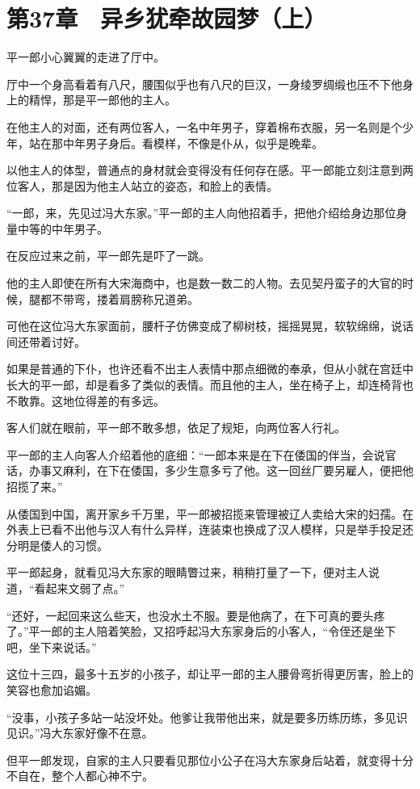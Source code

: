 \section{第37章　异乡犹牵故园梦（上）}

平一郎小心翼翼的走进了厅中。

厅中一个身高看着有八尺，腰围似乎也有八尺的巨汉，一身绫罗绸缎也压不下他身上的精悍，那是平一郎他的主人。

在他主人的对面，还有两位客人，一名中年男子，穿着棉布衣服，另一名则是个少年，站在那中年男子身后。看模样，不像是仆从，似乎是晚辈。

以他主人的体型，普通点的身材就会变得没有任何存在感。平一郎能立刻注意到两位客人，那是因为他主人站立的姿态，和脸上的表情。

“一郎，来，先见过冯大东家。”平一郎的主人向他招着手，把他介绍给身边那位身量中等的中年男子。

在反应过来之前，平一郎先是吓了一跳。

他的主人即使在所有大宋海商中，也是数一数二的人物。去见契丹蛮子的大官的时候，腿都不带弯，搂着肩膀称兄道弟。

可他在这位冯大东家面前，腰杆子仿佛变成了柳树枝，摇摇晃晃，软软绵绵，说话间还带着讨好。

如果是普通的下仆，也许还看不出主人表情中那点细微的奉承，但从小就在宫廷中长大的平一郎，却是看多了类似的表情。而且他的主人，坐在椅子上，却连椅背也不敢靠。这地位得差的有多远。

客人们就在眼前，平一郎不敢多想，依足了规矩，向两位客人行礼。

平一郎的主人向客人介绍着他的底细：“一郎本来是在下在倭国的伴当，会说官话，办事又麻利，在下在倭国，多少生意多亏了他。这一回丝厂要另雇人，便把他招揽了来。”

从倭国到中国，离开家乡千万里，平一郎被招揽来管理被辽人卖给大宋的妇孺。在外表上已看不出他与汉人有什么异样，连装束也换成了汉人模样，只是举手投足还分明是倭人的习惯。

平一郎起身，就看见冯大东家的眼睛瞥过来，稍稍打量了一下，便对主人说道，“看起来文弱了点。”

“还好，一起回来这么些天，也没水土不服。要是他病了，在下可真的要头疼了。”平一郎的主人陪着笑脸，又招呼起冯大东家身后的小客人，“令侄还是坐下吧，坐下来说话。”

这位十三四，最多十五岁的小孩子，却让平一郎的主人腰骨弯折得更厉害，脸上的笑容也愈加谄媚。

“没事，小孩子多站一站没坏处。他爹让我带他出来，就是要多历练历练，多见识见识。”冯大东家好像不在意。

但平一郎发现，自家的主人只要看见那位小公子在冯大东家身后站着，就变得十分不自在，整个人都心神不宁。

